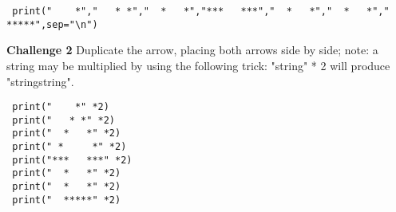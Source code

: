 \documentclass[a4paper,10pt]{article}
\begin{document}
\begin{verbatim}
 print("    *","   * *","  *   *","***   ***","  *   *","  *   *","  *****",sep="\n")
\end{verbatim}

\textbf{Challenge 2}
Duplicate the arrow, placing both arrows side by side; note: a string may be multiplied by using the following trick: {\selectfont "string" * 2} will produce {\selectfont "stringstring"}.
\newline

\begin{verbatim}
 print("    *" *2)
 print("   * *" *2)
 print("  *   *" *2)
 print(" *     *" *2)
 print("***   ***" *2)
 print("  *   *" *2)
 print("  *   *" *2)
 print("  *****" *2)
\end{verbatim}
\end{document}
